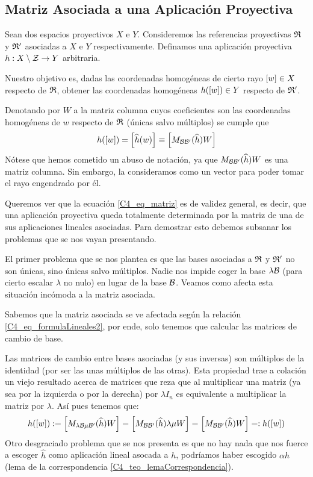 \subsection{Matriz Asociada a una Aplicación Proyectiva}
Sean dos espacios proyectivos $X$ e $Y$. Consideremos las referencias proyectivas $\mathfrak{R}$ y $\mathfrak{R}'$ asociadas a $X$ e $Y$ respectivamente. Definamos una aplicación proyectiva $h:X\setminus \mathcal{Z}\to Y$ arbitraria.

Nuestro objetivo es, dadas las coordenadas homogéneas de cierto rayo $\left [ w \right ]\in X$ respecto de $\mathfrak{R}$, obtener las coordenadas homogéneas $h(\left [ w \right ])\in Y$ respecto de $\mathfrak{R}'$.

Denotando por $W$ a la matriz columna cuyos coeficientes son las coordenadas homogéneas de $w$ respecto de $\mathfrak{R}$ (únicas salvo múltiplos) se cumple que
\begin{equation}
\label{C4_eq_matriz}
	h(\left [ w \right ])=\left [ \widehat{h}(w) \right ]\equiv\left [ M_{\mathcal{B}\mathcal{B}'}(\widehat{h})W \right ]
\end{equation}
Nótese que hemos cometido un abuso de notación, ya que $M_{\mathcal{B}\mathcal{B}'}(\widehat{h})W$ es una matriz columna. Sin embargo, la consideramos como un vector para poder tomar el rayo engendrado por él.

Queremos ver que la ecuación \eqref{C4_eq_matriz} es de validez general, es decir, que una aplicación proyectiva queda totalmente determinada por la matriz de una de sus aplicaciones lineales asociadas. Para demostrar esto debemos subsanar los problemas que se nos vayan presentando.

El primer problema que se nos plantea es que las bases asociadas a $\mathfrak{R}$ y $\mathfrak{R}'$ no son únicas, sino únicas salvo múltiplos. Nadie nos impide coger la base $\lambda\mathcal{B}$ (para cierto escalar $\lambda$ no nulo) en lugar de la base $\mathcal{B}$. Veamos como afecta esta situación incómoda a la matriz asociada.

Sabemos que la matriz asociada se ve afectada según la relación \eqref{C4_eq_formulaLineales2}, por ende, solo tenemos que calcular las matrices de cambio de base.

Las matrices de cambio entre bases asociadas (y sus inversas) son múltiplos de la identidad (por ser las unas múltiplos de las otras). Esta propiedad trae a colación un viejo resultado acerca de matrices que reza que al multiplicar una matriz (ya sea por la izquierda o por la derecha) por $\lambda I_n$ es equivalente a multiplicar la matriz por $\lambda$. Así pues tenemos que:
\begin{equation}
	h(\left [ w \right ]):=\left [ M_{\lambda \mathcal{B}\mu\mathcal{B}'}(\widehat{h})W \right ]=\left [ M_{\mathcal{B}\mathcal{B}'}(\widehat{h})\lambda\mu W \right ]=\left [ M_{\mathcal{B}\mathcal{B}'}(\widehat{h})W \right ]=:h(\left [ w \right ])
\end{equation}
Otro desgraciado problema que se nos presenta es que no hay nada que nos fuerce a escoger $\widehat{h}$ como aplicación lineal asocada a $h$, podríamos haber escogido $\alpha\widehat{h}$ (lema de la correspondencia \ref{C4_teo_lemaCorrespondencia}).

